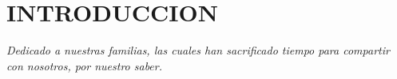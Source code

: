 \chapter*{INTRODUCCION}

\textit{Dedicado a nuestras familias, las cuales han sacrificado tiempo para compartir con nosotros, por nuestro saber.}